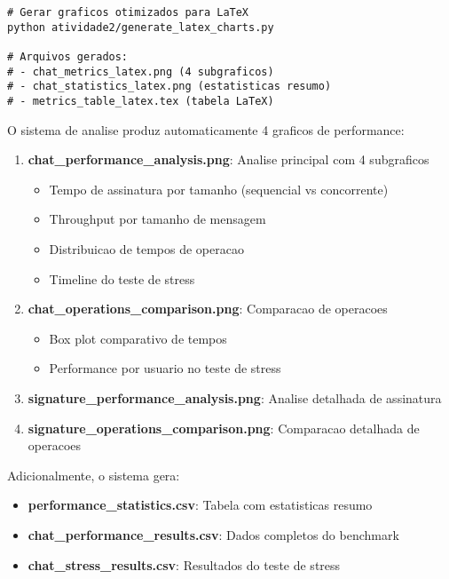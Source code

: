 \documentclass[12pt,a4paper,oneside]{article}
\begin{document}
\begin{lstlisting}[caption=Script para geracao de graficos LaTeX]
# Gerar graficos otimizados para LaTeX
python atividade2/generate_latex_charts.py

# Arquivos gerados:
# - chat_metrics_latex.png (4 subgraficos)
# - chat_statistics_latex.png (estatisticas resumo)
# - metrics_table_latex.tex (tabela LaTeX)
\end{lstlisting}

O sistema de analise produz automaticamente 4 graficos de performance:

\begin{enumerate}
    \item \textbf{chat\_performance\_analysis.png}: Analise principal com 4 subgraficos
    \begin{itemize}
        \item Tempo de assinatura por tamanho (sequencial vs concorrente)
        \item Throughput por tamanho de mensagem
        \item Distribuicao de tempos de operacao
        \item Timeline do teste de stress
    \end{itemize}
    
    \item \textbf{chat\_operations\_comparison.png}: Comparacao de operacoes
    \begin{itemize}
        \item Box plot comparativo de tempos
        \item Performance por usuario no teste de stress
    \end{itemize}
    
    \item \textbf{signature\_performance\_analysis.png}: Analise detalhada de assinatura
    
    \item \textbf{signature\_operations\_comparison.png}: Comparacao detalhada de operacoes
\end{enumerate}

Adicionalmente, o sistema gera:
\begin{itemize}
    \item \textbf{performance\_statistics.csv}: Tabela com estatisticas resumo
    \item \textbf{chat\_performance\_results.csv}: Dados completos do benchmark
    \item \textbf{chat\_stress\_results.csv}: Resultados do teste de stress
\end{itemize}
\end{document}
